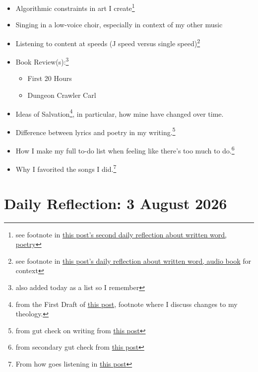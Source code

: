 \documentclass[12pt]{article}
\renewcommand{\,}{\textsuperscript{,}}
\begin{document}
\begin{itemize}
\item Algorithmic constraints in art I create\footnote{see footnote in \href{reflection-june-2026}{this post's second daily reflection about written word, poetry}}

\item Singing in a low-voice choir, especially in context of my other music

\item Listening to content at speeds (J speed versus single speed)\footnote{see footnote in \href{reflection-2}{this post's daily reflection about written word, audio book} for context}

\item Book Review(s):\footnote{also added today as a list so I remember}

\begin{itemize}

\item First 20 Hours

\item Dungeon Crawler Carl

\end{itemize}

\item Ideas of Salvation\footnote{from the First Draft of \href{reflection-2}{this post}, footnote where I discuss changes to my theology.}, in particular, how mine have changed over time.

\item Difference between lyrics and poetry in my writing.\footnote{from gut check on writing from \href{daily-reflection-2026-08-03}{this post}}

\item How I make my full to-do list when feeling like there's too much to do.\footnote{from secondary gut check from \href{daily-reflection-2026-08-03}{this post}}

\item Why I favorited the songs I did.\footnote{From how goes listening in \href{daily-reflection-2026-08-03}{this post}}

\end{itemize}



\section{Daily Reflection: 3 August 2026}
\end{document}
